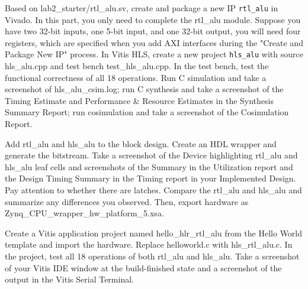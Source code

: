 \documentclass[a4paper,12pt,twoside]{article}
\begin{document}
Based on lab2\_starter/rtl\_alu.sv, create and package a new IP \texttt{rtl\_alu} in Vivado. In this part, you only need to complete the rtl\_alu module. Suppose you have two 32-bit inputs, one 5-bit input, and one 32-bit output, you will need four registers, which are specified when you add AXI interfaces during the "Create and Package New IP" process. In Vitis HLS, create a new project \texttt{hls\_alu} with source hls\_alu.cpp and test bench test\_hls\_alu.cpp. In the test bench, test the functional correctness of all 18 operations. Run C simulation and take a screenshot of hls\_alu\_csim.log; run C synthesis and take a screenshot of the Timing Estimate and Performance \& Resource Estimates in the Synthesis Summary Report; run cosimulation and take a screenshot of the Cosimulation Report.

Add rtl\_alu and hls\_alu to the block design. Create an HDL wrapper and generate the bitstream. Take a screenshot of the Device highlighting rtl\_alu and hls\_alu leaf cells and screenshots of the Summary in the Utilization report and the Design Timing Summary in the Timing report in your Implemented Design. Pay attention to whether there are latches. Compare the rtl\_alu and hls\_alu and summarize any differences you observed. Then, export hardware as Zynq\_CPU\_wrapper\_hw\_platform\_5.xsa.

Create a Vitis application project named hello\_hlr\_rtl\_alu from the Hello World template and import the hardware. Replace helloworld.c with hls\_rtl\_alu.c. In the project, test all 18 operations of both rtl\_alu and hls\_alu. Take a screenshot of your Vitis IDE window at the build-finished state and a screenshot of the output in the Vitis Serial Terminal.
\end{document}

